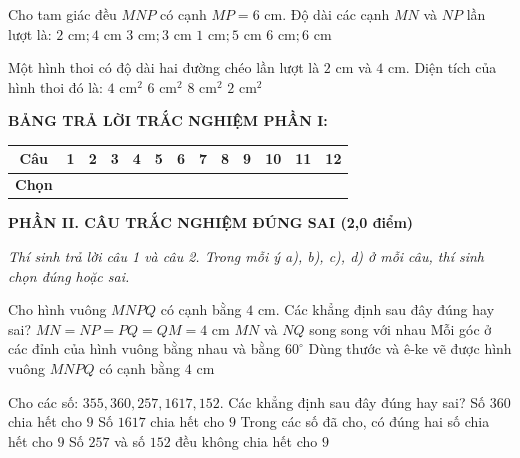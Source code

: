 \documentclass[12pt,a4paper]{article}
\begin{document}
\begin{ex}
Cho tam giác đều $MNP$ có cạnh $MP = 6\text{ cm}$. Độ dài các cạnh $MN$ và $NP$ lần lượt là:
\choice
{$2\text{ cm}; 4\text{ cm}$}
{$3\text{ cm}; 3\text{ cm}$}
{$1\text{ cm}; 5\text{ cm}$}
{\True $6\text{ cm}; 6\text{ cm}$}
\end{ex}

\begin{ex}
Một hình thoi có độ dài hai đường chéo lần lượt là $2\text{ cm}$ và $4\text{ cm}$. Diện tích của hình thoi đó là:
\choice
{\True $4\text{ cm}^2$}
{$6\text{ cm}^2$}
{$8\text{ cm}^2$}
{$2\text{ cm}^2$}
\end{ex}


\vspace{1mm}
\noindent\textbf{BẢNG TRẢ LỜI TRẮC NGHIỆM PHẦN I:}
\begin{center}
\begin{tabular}{|c|c|c|c|c|c|c|c|c|c|c|c|c|}
\hline
\textbf{Câu} & \textbf{1} & \textbf{2} & \textbf{3} & \textbf{4} & \textbf{5} & \textbf{6} & \textbf{7} & \textbf{8} & \textbf{9} & \textbf{10} & \textbf{11} & \textbf{12} \\
\hline
\textbf{Chọn} & \rule{0pt}{0.65cm} & & & & & & & & & & & \\
\hline
\end{tabular}
\end{center}
\vspace{2mm}

\setcounter{ex}{0}
\noindent\textbf{\large PHẦN II. CÂU TRẮC NGHIỆM ĐÚNG SAI (2,0 điểm)}

\textit{Thí sinh trả lời câu 1 và câu 2. Trong mỗi ý a), b), c), d) ở mỗi câu, thí sinh chọn đúng hoặc sai.}

\vspace{1mm}
\begin{ex}
Cho hình vuông $MNPQ$ có cạnh bằng $4\text{ cm}$. Các khẳng định sau đây đúng hay sai?
\choiceTF
{\True $MN = NP = PQ = QM = 4\text{ cm}$}
{$MN$ và $NQ$ song song với nhau}
{Mỗi góc ở các đỉnh của hình vuông bằng nhau và bằng $60^\circ$}
{\True Dùng thước và ê-ke vẽ được hình vuông $MNPQ$ có cạnh bằng $4\text{ cm}$}
\end{ex}

\begin{ex}
Cho các số: $355, 360, 257, 1617, 152$. Các khẳng định sau đây đúng hay sai?
\choiceTF
{\True Số $360$ chia hết cho $9$}
{Số $1617$ chia hết cho $9$}
{Trong các số đã cho, có đúng hai số chia hết cho $9$}
{\True Số $257$ và số $152$ đều không chia hết cho $9$}
\end{ex}
\end{document}
